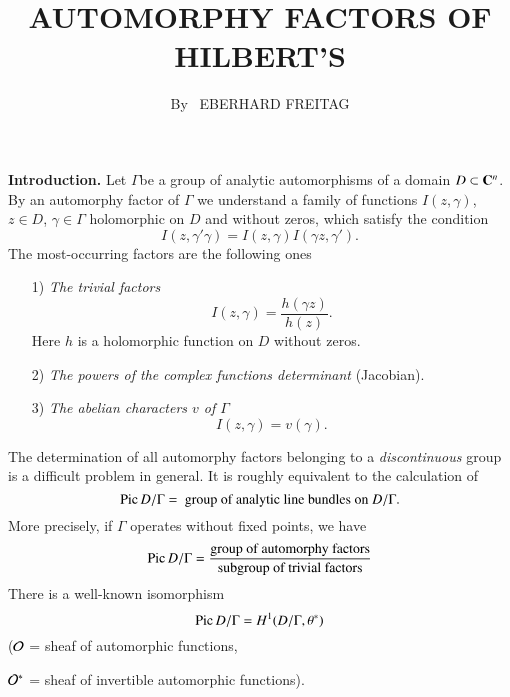 
\title{AUTOMORPHY FACTORS OF HILBERT'S}

\author{By~ EBERHARD FREITAG}

\date{}
\maketitle

\setcounter{pageoriginal}{8}

\noindent
\textbf{Introduction.}
Let $\Gamma$\pageoriginale be a group of analytic automorphisms of a domain $D \subset \mathbf{C}^n$. By an automorphy factor of $\Gamma$ we understand a family of functions $I(z,\gamma)$, $z \in D$, $\gamma \in \Gamma$ holomorphic on $D$ and without zeros, which satisfy the condition
$$
I(z, \gamma' \gamma) = I (z,\gamma) I (\gamma z, \gamma').
$$
The most-occurring factors are the following ones
\begin{enumerate}
\item[1)] \textit{The trivial factors}
$$
I (z, \gamma) = \frac{h(\gamma z)}{h(z)}.
$$
Here $h$ is a holomorphic function on $D$ without zeros.

\item[2)] {\it The powers of the complex functions determinant} (Jacobian).

\item[3)] {\it The abelian characters $v$ of $\Gamma$}
$$
I(z, \gamma) = v(\gamma).
$$
\end{enumerate}
The determination of all automorphy factors belonging to a \textit{discontinuous} group is a difficult problem in general. It is roughly equivalent to the calculation of 
$$
\operatorname{Pic} D/\Gamma = \text{ group of analytic line bundles on $D/\Gamma$}.
$$
More precisely, if $\Gamma$ operates without fixed points, we have
$$
\operatorname{Pic} D/\Gamma = \frac{\text{group of automorphy factors}}{\text{subgroup of trivial factors}}
$$
There is a well-known isomorphism
$$
\operatorname{Pic} D/\Gamma=H^1 (D/\Gamma, \theta^\ast)
$$
($\mathcal{O}$ = sheaf of automorphic functions,

\noindent
$\mathcal{O}^\ast$ = sheaf of invertible automorphic functions).


